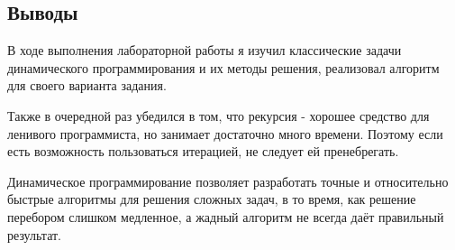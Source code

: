 \documentclass[12pt]{article}
\begin{document}
\subsection*{Выводы}

В ходе выполнения лабораторной работы я изучил классические задачи динамического программирования и их методы решения, реализовал алгоритм для своего варианта задания.
	
Также в очередной раз убедился в том, что рекурсия - хорошее средство для ленивого программиста, но занимает достаточно много времени. Поэтому если есть возможность пользоваться итерацией, не следует ей пренебрегать.

Динамическое программирование позволяет разработать точные и относительно быстрые алгоритмы для решения сложных задач, в то время, как решение перебором слишком медленное, а жадный алгоритм не всегда даёт правильный результат.
\end{document}
